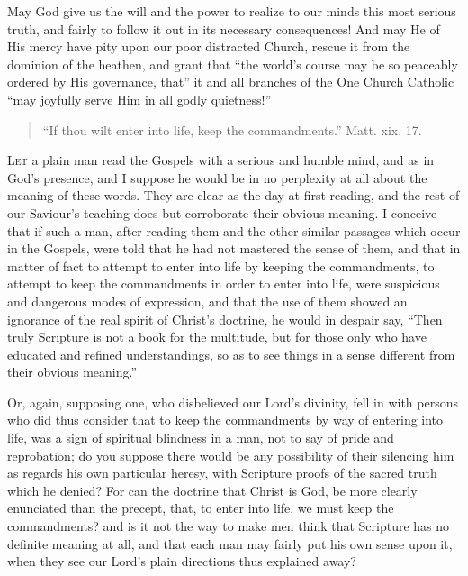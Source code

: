 May God give us the will and the power to realize to our minds this
most serious truth, and fairly to follow it out in its necessary
consequences! And may He of His mercy have pity upon our poor
distracted Church, rescue it from the dominion of the heathen, and
grant that ``the world's course may be so peaceably ordered by
His governance, that'' it and all branches of the One Church
Catholic ``may joyfully serve Him in all godly quietness!''


\begin{quote}

``If thou wilt enter into life, keep the commandments.''
Matt. xix. 17.

\end{quote}

L\textsc{et} a plain man read the Gospels with a serious and humble mind,
and as in God's presence, and I suppose he would be in no perplexity
at all about the meaning of these words. They are clear as the day at
first reading, and the rest of our Saviour's teaching does but
corroborate their obvious meaning. I conceive that if such a man,
after reading them and the other similar passages which occur in the
Gospels, were told that he had not mastered the sense of them, and
that in matter of fact to attempt to enter into life by keeping the
commandments, to attempt to keep the commandments in order to enter
into life, were suspicious and dangerous modes of expression, and that
the use of them showed an ignorance of the real spirit of Christ's
doctrine, he would in despair say, ``Then truly Scripture is not a
book for the multitude, but for those only who have educated and
refined understandings, so as to see things in a sense different from
their obvious meaning.''

Or, again, supposing one, who disbelieved our Lord's divinity,
fell in with persons who did thus consider that to keep the
commandments by way of entering into life, was a sign of spiritual
blindness in a man, not to say of pride and reprobation; do you
suppose there would be any possibility of their silencing him as
regards his own particular heresy, with Scripture proofs of the sacred
truth which he denied? For can the doctrine that Christ is God, be
more clearly enunciated than the precept, that, to enter into life, we
must keep the commandments? and is it not the way to make men think
that Scripture has no definite meaning at all, and that each man may
fairly put his own sense upon it, when they see our Lord's plain
directions thus explained away?

